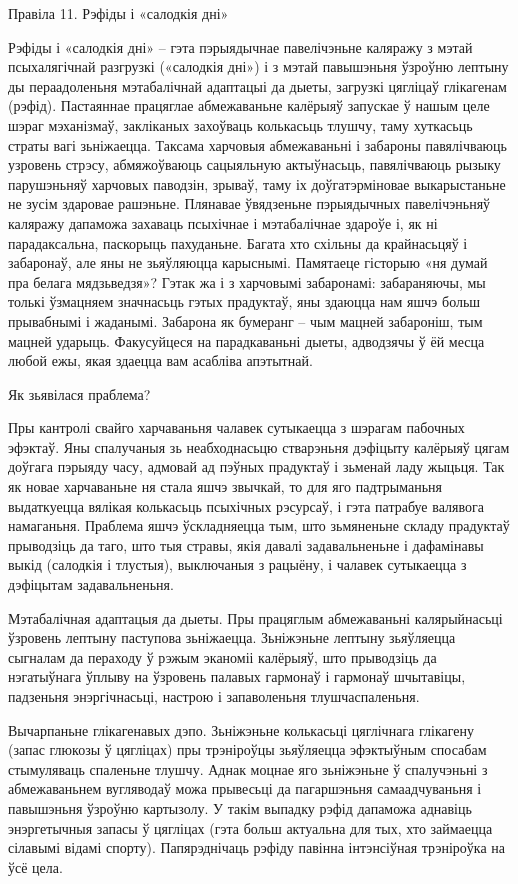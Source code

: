 Правіла 11. Рэфіды і «салодкія дні»

Рэфіды і «салодкія дні» – гэта пэрыядычнае павелічэньне каляражу з мэтай псыхалягічнай разгрузкі («салодкія дні») і з мэтай павышэньня ўзроўню лептыну ды пераадоленьня мэтабалічнай адаптацыі да дыеты, загрузкі цягліцаў глікагенам (рэфід). Пастаяннае працяглае абмежаваньне калёрыяў запускае ў нашым целе шэраг мэханізмаў, закліканых захоўваць колькасьць тлушчу, таму хуткасьць страты вагі зьніжаецца. Таксама харчовыя абмежаваньні і забароны павялічваюць узровень стрэсу, абмяжоўваюць сацыяльную актыўнасьць, павялічваюць рызыку парушэньняў харчовых паводзін, зрываў, таму іх доўгатэрміновае выкарыстаньне не зусім здаровае рашэньне. Плянавае ўвядзеньне пэрыядычных павелічэньняў каляражу дапаможа захаваць псыхічнае і мэтабалічнае здароўе і, як ні парадаксальна, паскорыць пахуданьне.
Багата хто схільны да крайнасьцяў і забаронаў, але яны не зьяўляюцца карыснымі. Памятаеце гісторыю «ня думай пра белага мядзьведзя»? Гэтак жа і з харчовымі забаронамі: забараняючы, мы толькі ўзмацняем значнасьць гэтых прадуктаў, яны здаюцца нам яшчэ больш прывабнымі і жаданымі. Забарона як бумеранг – чым мацней забароніш, тым мацней ударыць. Факусуйцеся на парадкаваньні дыеты, адводзячы ў ёй месца любой ежы, якая здаецца вам асабліва апэтытнай.

Як зьявілася праблема?

Пры кантролі свайго харчаваньня чалавек сутыкаецца з шэрагам пабочных эфэктаў. Яны спалучаныя зь неабходнасьцю стварэньня дэфіцыту калёрыяў цягам доўгага пэрыяду часу, адмовай ад пэўных прадуктаў і зьменай ладу жыцьця. Так як новае харчаваньне ня стала яшчэ звычкай, то для яго падтрыманьня выдаткуецца вялікая колькасьць псыхічных рэсурсаў, і гэта патрабуе валявога намаганьня. Праблема яшчэ ўскладняецца тым, што зьмяненьне складу прадуктаў прыводзіць да таго, што тыя стравы, якія давалі задавальненьне і дафамінавы выкід (салодкія і тлустыя), выключаныя з рацыёну, і чалавек сутыкаецца з дэфіцытам задавальненьня.

Мэтабалічная адаптацыя да дыеты.
Пры працяглым абмежаваньні калярыйнасьці ўзровень лептыну паступова зьніжаецца. Зьніжэньне лептыну зьяўляецца сыгналам да пераходу ў рэжым эканоміі калёрыяў, што прыводзіць да нэгатыўнага ўплыву на ўзровень палавых гармонаў і гармонаў шчытавіцы, падзеньня энэргічнасьці, настрою і запаволеньня тлушчаспаленьня.

Вычарпаньне глікагенавых дэпо.
Зьніжэньне колькасьці цяглічнага глікагену (запас глюкозы ў цягліцах) пры трэніроўцы зьяўляецца эфэктыўным спосабам стымуляваць спаленьне тлушчу. Аднак моцнае яго зьніжэньне ў спалучэньні з абмежаваньнем вугляводаў можа прывесьці да пагаршэньня самаадчуваньня і павышэньня ўзроўню картызолу. У такім выпадку рэфід дапаможа аднавіць энэргетычныя запасы ў цягліцах (гэта больш актуальна для тых, хто займаецца сілавымі відамі спорту). Папярэднічаць рэфіду павінна інтэнсіўная трэніроўка на ўсё цела.

